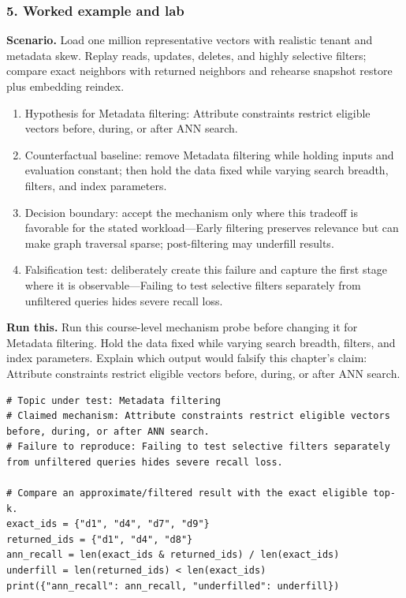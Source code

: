 \subsubsection*{5. Worked example and lab}
\textbf{Scenario.} Load one million representative vectors with realistic tenant and metadata skew. Replay reads, updates, deletes, and highly selective filters; compare exact neighbors with returned neighbors and rehearse snapshot restore plus embedding reindex.
\begin{enumerate}
\item Hypothesis for Metadata filtering: Attribute constraints restrict eligible vectors before, during, or after ANN search.
\item Counterfactual baseline: remove Metadata filtering while holding inputs and evaluation constant; then hold the data fixed while varying search breadth, filters, and index parameters.
\item Decision boundary: accept the mechanism only where this tradeoff is favorable for the stated workload—Early filtering preserves relevance but can make graph traversal sparse; post-filtering may underfill results.
\item Falsification test: deliberately create this failure and capture the first stage where it is observable—Failing to test selective filters separately from unfiltered queries hides severe recall loss.
\end{enumerate}
\textbf{Run this.} Run this course-level mechanism probe before changing it for Metadata filtering. Hold the data fixed while varying search breadth, filters, and index parameters. Explain which output would falsify this chapter's claim: Attribute constraints restrict eligible vectors before, during, or after ANN search.
\begin{Verbatim}[fontsize=\scriptsize]
# Topic under test: Metadata filtering
# Claimed mechanism: Attribute constraints restrict eligible vectors before, during, or after ANN search.
# Failure to reproduce: Failing to test selective filters separately from unfiltered queries hides severe recall loss.

# Compare an approximate/filtered result with the exact eligible top-k.
exact_ids = {"d1", "d4", "d7", "d9"}
returned_ids = {"d1", "d4", "d8"}
ann_recall = len(exact_ids & returned_ids) / len(exact_ids)
underfill = len(returned_ids) < len(exact_ids)
print({"ann_recall": ann_recall, "underfilled": underfill})
\end{Verbatim}
